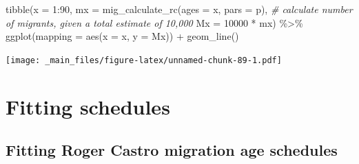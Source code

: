 \documentclass[
]{book}
\newenvironment{Shaded}{\begin{snugshade}}{\end{snugshade}}
\newcommand{\AttributeTok}[1]{\textcolor[rgb]{0.77,0.63,0.00}{#1}}
\newcommand{\CommentTok}[1]{\textcolor[rgb]{0.56,0.35,0.01}{\textit{#1}}}
\newcommand{\DecValTok}[1]{\textcolor[rgb]{0.00,0.00,0.81}{#1}}
\newcommand{\FunctionTok}[1]{\textcolor[rgb]{0.00,0.00,0.00}{#1}}
\newcommand{\NormalTok}[1]{#1}
\newcommand{\SpecialCharTok}[1]{\textcolor[rgb]{0.00,0.00,0.00}{#1}}
\begin{document}
\begin{Shaded}
\begin{Highlighting}[]
\FunctionTok{tibble}\NormalTok{(}\AttributeTok{x =} \DecValTok{1}\SpecialCharTok{:}\DecValTok{90}\NormalTok{, }
       \AttributeTok{mx =} \FunctionTok{mig\_calculate\_rc}\NormalTok{(}\AttributeTok{ages =}\NormalTok{ x, }\AttributeTok{pars =}\NormalTok{ p),}
       \CommentTok{\# calculate number of migrants, given a total estimate of 10,000}
       \AttributeTok{Mx =} \DecValTok{10000} \SpecialCharTok{*}\NormalTok{ mx) }\SpecialCharTok{\%\textgreater{}\%}
  \FunctionTok{ggplot}\NormalTok{(}\AttributeTok{mapping =} \FunctionTok{aes}\NormalTok{(}\AttributeTok{x =}\NormalTok{ x, }\AttributeTok{y =}\NormalTok{ Mx)) }\SpecialCharTok{+}
  \FunctionTok{geom\_line}\NormalTok{()}
\end{Highlighting}
\end{Shaded}

\texttt{[image: \_main\_files/figure-latex/unnamed-chunk-89-1.pdf]}

\hypertarget{fitting-schedules}{%
\section{Fitting schedules}\label{fitting-schedules}}

\hypertarget{fitting-roger-castro-migration-age-schedules}{%
\subsection{Fitting Roger Castro migration age schedules}\label{fitting-roger-castro-migration-age-schedules}}
\end{document}
